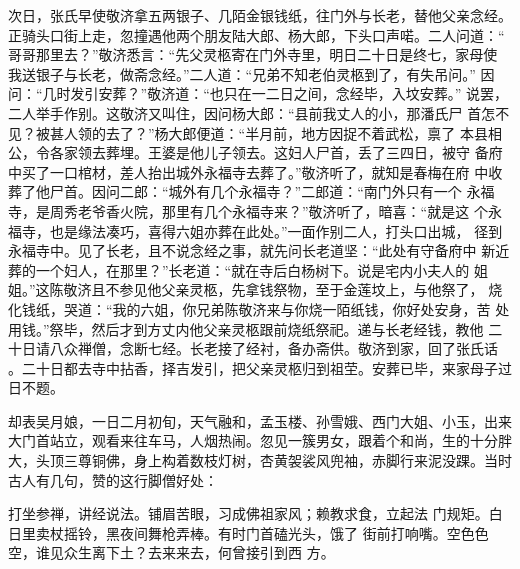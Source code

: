 次日，张氏早使敬济拿五两银子、几陌金银钱纸，往门外与长老，替他父亲念经。
正骑头口街上走，忽撞遇他两个朋友陆大郎、杨大郎，下头口声喏。二人问道：“
哥哥那里去？”敬济悉言：“先父灵柩寄在门外寺里，明日二十日是终七，家母使
我送银子与长老，做斋念经。”二人道：“兄弟不知老伯灵柩到了，有失吊问。”
因问：“几时发引安葬？”敬济道：“也只在一二日之间，念经毕，入坟安葬。”
说罢，二人举手作别。这敬济又叫住，因问杨大郎：“县前我丈人的小，那潘氏尸
首怎不见？被甚人领的去了？”杨大郎便道：“半月前，地方因捉不着武松，禀了
本县相公，令各家领去葬埋。王婆是他儿子领去。这妇人尸首，丢了三四日，被守
备府中买了一口棺材，差人抬出城外永福寺去葬了。”敬济听了，就知是春梅在府
中收葬了他尸首。因问二郎：“城外有几个永福寺？”二郎道：“南门外只有一个
永福寺，是周秀老爷香火院，那里有几个永福寺来？”敬济听了，暗喜：“就是这
个永福寺，也是缘法凑巧，喜得六姐亦葬在此处。”一面作别二人，打头口出城，
径到永福寺中。见了长老，且不说念经之事，就先问长老道坚：“此处有守备府中
新近葬的一个妇人，在那里？”长老道：“就在寺后白杨树下。说是宅内小夫人的
姐姐。”这陈敬济且不参见他父亲灵柩，先拿钱祭物，至于金莲坟上，与他祭了，
烧化钱纸，哭道：“我的六姐，你兄弟陈敬济来与你烧一陌纸钱，你好处安身，苦
处用钱。”祭毕，然后才到方丈内他父亲灵柩跟前烧纸祭祀。递与长老经钱，教他
二十日请八众禅僧，念断七经。长老接了经衬，备办斋供。敬济到家，回了张氏话
。二十日都去寺中拈香，择吉发引，把父亲灵柩归到祖茔。安葬已毕，来家母子过
日不题。

却表吴月娘，一日二月初旬，天气融和，孟玉楼、孙雪娥、西门大姐、小玉，出来
大门首站立，观看来往车马，人烟热闹。忽见一簇男女，跟着个和尚，生的十分胖
大，头顶三尊铜佛，身上构着数枝灯树，杏黄袈裟风兜袖，赤脚行来泥没踝。当时
古人有几句，赞的这行脚僧好处：

打坐参禅，讲经说法。铺眉苦眼，习成佛祖家风；赖教求食，立起法
门规矩。白日里卖杖摇铃，黑夜间舞枪弄棒。有时门首磕光头，饿了
街前打响嘴。空色色空，谁见众生离下土？去来来去，何曾接引到西
方。

